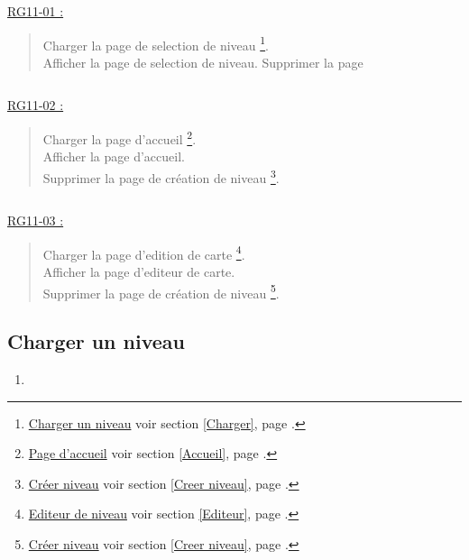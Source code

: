\documentclass{report}
\begin{document}
			\underline{RG11-01 :}
				\begin{quote}
					Charger la page de selection de niveau%
						\footnote[1]{
							\hyperlink{Charger un niveau}{Charger un niveau}
							\og voir section \ref{Charger}, page \pageref{Charger}.\fg
						}.\\
					Afficher la page de selection de niveau\footnotemark[1].
					Supprimer la page
				\end{quote}
				
			$\,$

			\underline{RG11-02 :}
				\begin{quote}
					Charger la page d'accueil%
						\footnote[2]{
							\hyperlink{Page d'accueil}{Page d'accueil}
							\og voir section \ref{Accueil}, page \pageref{Accueil}.\fg
						}.\\
					Afficher la page d'accueil\footnotemark[2].\\
					Supprimer la page de création de niveau%
					\footnote[3]{
						\hyperlink{Creer niveau}{Créer niveau}
						\og voir section \ref{Creer niveau}, page \pageref{Creer niveau}.\fg
					}.
				\end{quote}
				
			$\,$
			
			\underline{RG11-03 :}
				\begin{quote}
					Charger la page d'edition de carte%
					\footnote[2]{
							\hyperlink{Editeur}{Editeur de niveau}
							\og voir section \ref{Editeur}, page \pageref{Editeur}.\fg
						}.\\
					Afficher la page d'editeur de carte\footnotemark[2].\\
					Supprimer la page de création de niveau%
					\footnote[3]{
						\hyperlink{Creer niveau}{Créer niveau}
						\og voir section \ref{Creer niveau}, page \pageref{Creer niveau}.\fg
					}.
				\end{quote}
				
\newpage
	
	\subsection{Charger un niveau}
		
		\hypertarget{Charger niveau}{}
		\label{Charger niveau}
			
		\begin{center}

		\end{center}

		\begin{enumerate}
		  \item 
		\end{enumerate}
\end{document}
